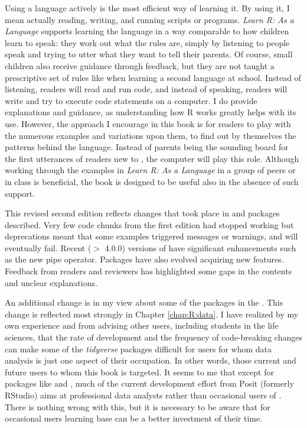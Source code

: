 \documentclass[krantz2]{krantz}\usepackage{knitr}
\begin{document}
Using a language actively is the most efficient way of learning it. By using it, I mean actually reading, writing, and running scripts or programs. \emph{Learn R: As a Language} supports learning the \Rlang language in a way comparable to how children learn to speak: they work out what the rules are, simply by listening to people speak and trying to utter what they want to tell their parents. Of course, small children also receive guidance through feedback, but they are not taught a prescriptive set of rules like when learning a second language at school. Instead of listening, readers will read and run code, and instead of speaking, readers will write and try to execute \Rlang code statements on a computer. I do provide explanations and guidance, as understanding how R works greatly helps with its use. However, the approach I encourage in this book is for readers to play with the numerous examples and variations upon them, to find out by themselves the patterns behind the \Rlang language. Instead of parents being the sounding board for the first utterances of readers new to \Rlang, the computer will play this role. Although working through the examples in \emph{Learn R: As a Language} in a group of peers or in class is beneficial, the book is designed to be useful also in the absence of such support.

This revised second edition reflects changes that took place in \Rlang and packages described. Very few code chunks from the first edition had stopped working but deprecations meant that some examples triggered messages or warnings, and will eventually fail. Recent ($>$ 4.0.0) versions of \Rlang have significant enhancements such as the new pipe operator. Packages have also evolved acquiring new features. Feedback from readers and reviewers has highlighted some gaps in the contents and unclear explanations.

An additional change is in my view about some of the packages in the . This change is reflected most strongly in Chapter \ref{chap:R:data}. I have realized by my own experience and from advising other users, including students in the life sciences, that the rate of development and the frequency of code-breaking changes can make some of the \emph{tidyverse} packages difficult for users for whom data analysis is just one aspect of their occupation. In other words, those current and future users to whom this book is targeted. It seems to me that except for packages like  and , much of the current development effort from Posit (formerly RStudio) aims at professional data analysts rather than occasional users of \Rlang. There is nothing wrong with this, but it is necessary to be aware that for occasional users learning base \Rlang can be a better investment of their time.
\end{document}
